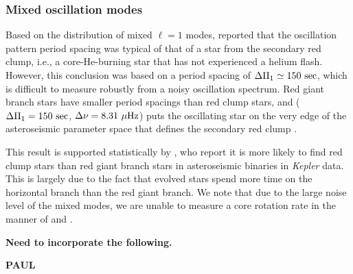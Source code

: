 \subsubsection{Mixed oscillation modes}
\label{subsubsec_mixed}
Based on the distribution of mixed $\ell = 1$ modes, \citet{gau14} reported that the oscillation pattern period spacing was typical of that of a star from the secondary red clump, i.e., a core-He-burning star that has not experienced a helium flash. However, this conclusion was based on a  period spacing of $\Delta \Pi_1 \simeq 150 \ \rm{sec}$, which is difficult to measure robustly from a noisy oscillation spectrum. Red giant branch stars have smaller period spacings than red clump stars, and ($\Delta \Pi_1 = 150 \ \rm{sec}$, $\Delta \nu = 8.31 \ \mu \rm{Hz}$) puts the oscillating star on the very edge of the asteroseismic parameter space that defines the secondary red clump \citep{mos14}.

 This result is supported statistically by \citet{mig14}, who report it is more likely to find red clump stars than red giant branch stars in asteroseismic binaries in \emph{Kepler} data. This is largely due to the fact that evolved stars spend more time on the horizontal branch than the red giant branch. We note that due to the large noise level of the mixed modes, we are unable to measure a core rotation rate in the manner of \citet{bec12} and \citet{mos12}. 

\textbf{Need to incorporate the following.}

\textbf{PAUL}

